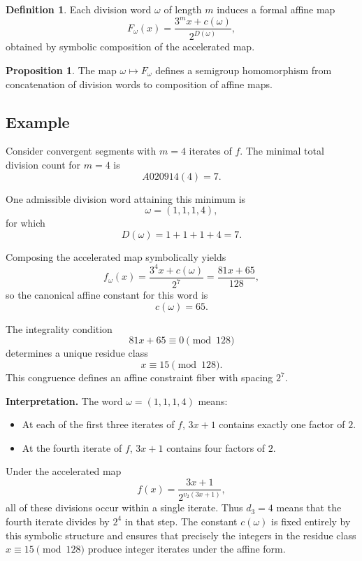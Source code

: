\documentclass[12pt, oneside]{article}
\numberwithin{equation}{section}
\theoremstyle{definition}
\newtheorem{definition}{Definition}[section]
\newtheorem{proposition}{Proposition}[section]
\theoremstyle{plain}
\theoremstyle{remark}
\begin{document}
\begin{definition}
Each division word $\omega$ of length $m$ induces a formal affine map
\[
F_\omega(x) = \frac{3^m x + c(\omega)}{2^{D(\omega)}},
\]
obtained by symbolic composition of the accelerated map.
\end{definition}

\begin{proposition}
The map $\omega \mapsto F_\omega$ defines a semigroup homomorphism
from concatenation of division words to composition of affine maps.
\end{proposition}

\subsection{Example}

Consider convergent segments with $m=4$ iterates of $f$.  
The minimal total division count for $m=4$ is
\[
A020914(4) = 7.
\]

One admissible division word attaining this minimum is
\[
\omega = (1,1,1,4),
\]
for which
\[
D(\omega) = 1+1+1+4 = 7.
\]

Composing the accelerated map symbolically yields
\[
f_\omega(x)=\frac{3^4 x + c(\omega)}{2^7}
           = \frac{81x + 65}{128},
\]
so the canonical affine constant for this word is
\[
c(\omega)=65.
\]

The integrality condition
\[
81x + 65 \equiv 0 \pmod{128}
\]
determines a unique residue class
\[
x \equiv 15 \pmod{128}.
\]
This congruence defines an affine constraint fiber with spacing $2^{7}$.

\medskip

\noindent
\textbf{Interpretation.}
The word $\omega = (1,1,1,4)$ means:

\begin{itemize}
    \item At each of the first three iterates of $f$, $3x+1$ contains exactly one factor of $2$.
    \item At the fourth iterate of $f$, $3x+1$ contains four factors of $2$.
\end{itemize}

Under the accelerated map
\[
f(x)=\frac{3x+1}{2^{v_2(3x+1)}},
\]
all of these divisions occur within a single iterate. Thus $d_3=4$ means that
the fourth iterate divides by $2^4$ in that step. The constant $c(\omega)$ is
fixed entirely by this symbolic structure and ensures that precisely the
integers in the residue class $x \equiv 15 \pmod{128}$ produce integer iterates
under the affine form.
\end{document}
